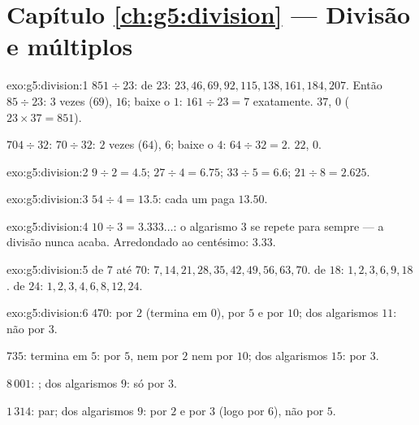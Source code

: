 \section*{Capítulo \ref{ch:g5:division} --- Divisão e múltiplos}

\begin{solution}{exo:g5:division:1}
$851 \div 23$:  de $23$: $23, 46, 69, 92, 115, 138, 161,
184, 207$. Então $85 \div 23$: $3$ vezes ($69$),  $16$; baixe o
$1$: $161 \div 23 = 7$ exatamente.  $37$,  $0$
($23 \times 37 = 851$).

$704 \div 32$: $70 \div 32$: $2$ vezes ($64$),  $6$; baixe o
$4$: $64 \div 32 = 2$.  $22$,  $0$.
\end{solution}

\begin{solution}{exo:g5:division:2}
$9 \div 2 = 4.5$; \quad $27 \div 4 = 6.75$; \quad
$33 \div 5 = 6.6$; \quad $21 \div 8 = 2.625$.
\end{solution}

\begin{solution}{exo:g5:division:3}
$54 \div 4 = 13.5$: cada um paga $13.50$.
\end{solution}

\begin{solution}{exo:g5:division:4}
$10 \div 3 = 3.333\dots$: o algarismo $3$ se repete para sempre --- a
divisão nunca acaba. Arredondado ao centésimo: $3.33$.
\end{solution}

\begin{solution}{exo:g5:division:5}
 de $7$ até $70$: $7, 14, 21, 28, 35, 42, 49, 56, 63, 70$.
 de $18$: $1, 2, 3, 6, 9, 18$.  de $24$:
$1, 2, 3, 4, 6, 8, 12, 24$.
\end{solution}

\begin{solution}{exo:g5:division:6}
$470$: por $2$ (termina em $0$), por $5$ e por $10$;  dos
algarismos $11$: não por $3$.

$735$: termina em $5$: por $5$, nem por $2$ nem por $10$;  dos
algarismos $15$: por $3$.

$8\,001$: ;  dos algarismos $9$: só por $3$.

$1\,314$: par;  dos algarismos $9$: por $2$ e por $3$ (logo por
$6$), não por $5$.
\end{solution}


